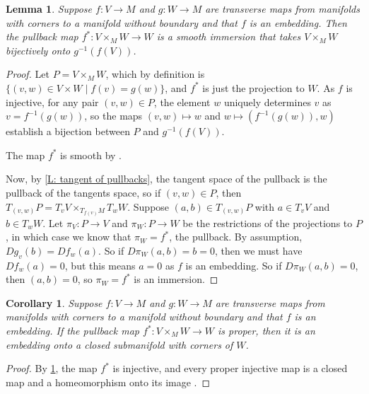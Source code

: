 \documentclass[12pt]{article}
\theoremstyle{plain}
\newtheorem{corollary}[theorem]{Corollary}
\newtheorem{lemma}[theorem]{Lemma}
\theoremstyle{definition}
\theoremstyle{remark}
\begin{document}
\begin{lemma}\label{L: pullback immersion}
	Suppose $f \colon V \to M$ and $g \colon W \to M$ are transverse maps from manifolds with corners to a manifold without boundary and that $f$ is an embedding. 
	Then the pullback map $f^* \colon V \times_M W \to W$ is a smooth immersion that takes $V \times_M W$ bijectively onto $g^{-1}(f(V))$.
\end{lemma}
\begin{proof}
	Let $P = V \times_M W$, which by definition is $\{ (v,w) \in V \times W \mid f(v) = g(w) \}$, and $f^*$ is just the projection to $W$. 
	As $f$ is injective, for any pair $(v,w) \in P$, the element $w$ uniquely determines $v$ as $v = f^{-1}(g(w))$, so the maps $(v, w) \mapsto w$ and $w \mapsto (f^{-1}(g(w)), w)$ establish a bijection between $P$ and $g^{-1}(f(V))$. 
	
	The map $f^*$ is smooth by \cite[Section 6]{Joy12}.
	
	Now, by \cref{L: tangent of pullbacks}, the tangent space of the pullback is the pullback of the tangents space, so if $(v,w) \in P$, then $T_{(v,w)}P = T_vV \times_{T_{f(v)}M} T_wW$. 
	Suppose $(a,b) \in T_{(v,w)}P$ with $a \in T_vV$ and $b \in T_wW$. 
	Let $\pi_V \colon P \to V$ and $\pi_W \colon P \to W$ be the restrictions of the projections to $P$, in which case we know that $\pi_W = f^*$, the pullback. 
	By assumption, $Dg_v(b) = Df_w(a)$. 
	So if $D\pi_W(a,b) = b = 0$, then we must have $Df_w(a)=0$, but this means $a = 0$ as $f$ is an embedding.
	So if $D\pi_W(a,b) = 0$, then $(a,b) = 0$, so $\pi_W = f^*$ is an immersion.
\end{proof}

\begin{corollary}
	Suppose $f \colon V \to M$ and $g \colon W \to M$ are transverse maps from manifolds with corners to a manifold without boundary and that $f$ is an embedding. 
	If the pullback map $f^* \colon V \times_M W \to W$ is proper, then it is an embedding onto a closed submanifold with corners of $W$.
\end{corollary}
\begin{proof}
By \cref{L: pullback immersion}, the map $f^*$ is injective, and every proper injective map is a closed map and a homeomorphism onto its image \cite[Proposition 10.1.2]{Bou98}.
\end{proof}
\end{document}
